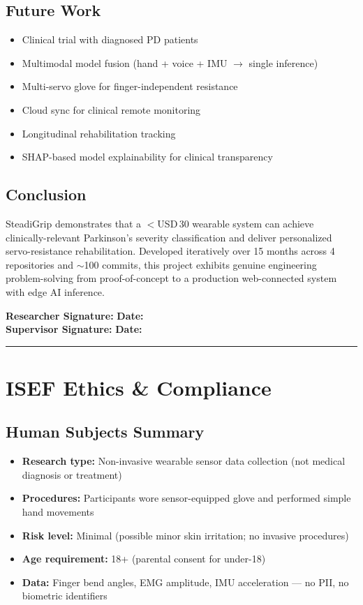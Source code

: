 \documentclass[12pt,a4paper]{article}
\newcommand{\sigblock}{%
  \vspace{0.6em}
  \noindent\textbf{Researcher Signature:} \underline{\hspace{6cm}} \quad \textbf{Date:} \underline{\hspace{3cm}}\\[0.4em]
  \noindent\textbf{Supervisor Signature:} \underline{\hspace{6cm}} \quad \textbf{Date:} \underline{\hspace{3cm}}
  \vspace{0.4em}\hrule\vspace{0.6em}
}
\begin{document}
\subsection{Future Work}
\begin{itemize}
  \item Clinical trial with diagnosed PD patients
  \item Multimodal model fusion (hand + voice + IMU $\rightarrow$ single inference)
  \item Multi-servo glove for finger-independent resistance
  \item Cloud sync for clinical remote monitoring
  \item Longitudinal rehabilitation tracking
  \item SHAP-based model explainability for clinical transparency
\end{itemize}

\subsection{Conclusion}
SteadiGrip demonstrates that a $<$USD\,30 wearable system can achieve clinically-relevant Parkinson's severity classification and deliver personalized servo-resistance rehabilitation. Developed iteratively over 15 months across 4 repositories and $\sim$100 commits, this project exhibits genuine engineering problem-solving from proof-of-concept to a production web-connected system with edge AI inference.

\sigblock

\section{ISEF Ethics \& Compliance}

\subsection{Human Subjects Summary}
\begin{itemize}
  \item \textbf{Research type:} Non-invasive wearable sensor data collection (not medical diagnosis or treatment)
  \item \textbf{Procedures:} Participants wore sensor-equipped glove and performed simple hand movements
  \item \textbf{Risk level:} Minimal (possible minor skin irritation; no invasive procedures)
  \item \textbf{Age requirement:} 18+ (parental consent for under-18)
  \item \textbf{Data:} Finger bend angles, EMG amplitude, IMU acceleration --- no PII, no biometric identifiers
\end{itemize}
\end{document}
